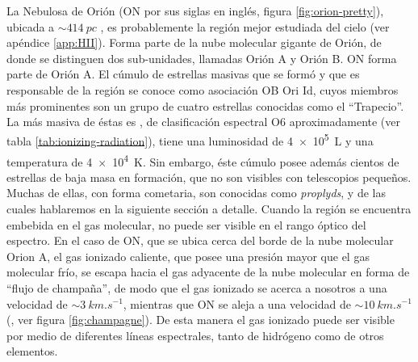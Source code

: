 La Nebulosa de Orión (ON por sus siglas en inglés, figura \ref{fig:orion-pretty}), ubicada a $\sim \SI{414}{pc}$ \citep{Menten:2007}, es probablemente la región  mejor estudiada del cielo (ver apéndice \ref{app:HII}). Forma parte de la nube molecular gigante de Orión, de donde se distinguen dos sub-unidades, llamadas Orión A y Orión B. ON forma parte de Orión A. El cúmulo de estrellas masivas que se formó y que es responsable de la región  se conoce como asociación OB Ori Id, cuyos miembros más prominentes son un grupo de cuatro estrellas conocidas como el ``Trapecio''. La más masiva de éstas es \thC{}, de clasificación espectral O6 aproximadamente (ver tabla \ref{tab:ionizing-radiation}), tiene una luminosidad de \SI{4e5}{L_\odot} y una temperatura de \SI{4e4}{K}. Sin embargo, éste cúmulo posee además cientos de estrellas de baja masa en formación, que no son visibles con telescopios pequeños. Muchas de ellas, con forma cometaria, son conocidas como \textit{proplyds}, y de las cuales hablaremos en la siguiente sección a detalle. Cuando la región  se encuentra embebida en el gas molecular, no puede ser visible en el rango óptico del espectro. En el caso de ON, que se ubica cerca del borde de la nube molecular Orion A, el gas ionizado caliente, que posee una presión mayor que el gas molecular frío, se escapa hacia el gas adyacente de la nube molecular en forma de ``flujo de champaña'', de modo que el gas ionizado se acerca a nosotros a una velocidad de $\sim \SI{3}{km.s^{-1}}$, mientras que ON se aleja a una velocidad de $\sim \SI{10}{km.s^{-1}}$ (\citet{Stahler:2004}, ver figura \ref{fig:champagne}). De esta manera el gas ionizado puede ser visible por medio de diferentes líneas espectrales, tanto de hidrógeno como de otros elementos. 

